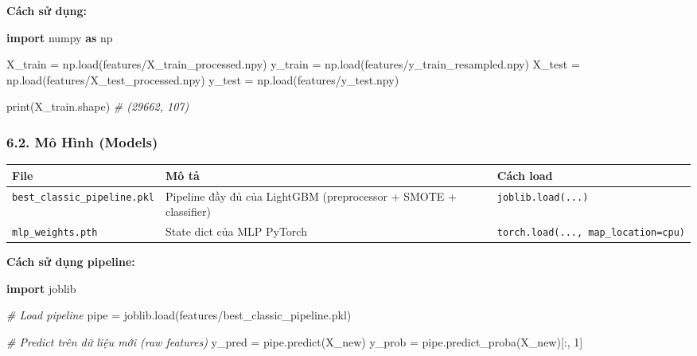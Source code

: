\documentclass[
]{article}
\newenvironment{Shaded}{}{}
\newcommand{\BuiltInTok}[1]{\textcolor[rgb]{0.00,0.50,0.00}{#1}}
\newcommand{\CommentTok}[1]{\textcolor[rgb]{0.38,0.63,0.69}{\textit{#1}}}
\newcommand{\DecValTok}[1]{\textcolor[rgb]{0.25,0.63,0.44}{#1}}
\newcommand{\ImportTok}[1]{\textcolor[rgb]{0.00,0.50,0.00}{\textbf{#1}}}
\newcommand{\NormalTok}[1]{#1}
\newcommand{\OperatorTok}[1]{\textcolor[rgb]{0.40,0.40,0.40}{#1}}
\newcommand{\StringTok}[1]{\textcolor[rgb]{0.25,0.44,0.63}{#1}}
\newcounter{none} %
\begin{document}
\textbf{Cách sử dụng:}

\begin{Shaded}
\begin{Highlighting}[]
\ImportTok{import}\NormalTok{ numpy }\ImportTok{as}\NormalTok{ np}

\NormalTok{X\_train }\OperatorTok{=}\NormalTok{ np.load(}\StringTok{\textquotesingle{}features/X\_train\_processed.npy\textquotesingle{}}\NormalTok{)}
\NormalTok{y\_train }\OperatorTok{=}\NormalTok{ np.load(}\StringTok{\textquotesingle{}features/y\_train\_resampled.npy\textquotesingle{}}\NormalTok{)}
\NormalTok{X\_test }\OperatorTok{=}\NormalTok{ np.load(}\StringTok{\textquotesingle{}features/X\_test\_processed.npy\textquotesingle{}}\NormalTok{)}
\NormalTok{y\_test }\OperatorTok{=}\NormalTok{ np.load(}\StringTok{\textquotesingle{}features/y\_test.npy\textquotesingle{}}\NormalTok{)}

\BuiltInTok{print}\NormalTok{(X\_train.shape)  }\CommentTok{\# (29662, 107)}
\end{Highlighting}
\end{Shaded}

\subsubsection{6.2. Mô Hình (Models)}\label{62-muxf4-huxecnh-models}

{\def\LTcaptype{none} %
\begin{longtable}[]{@{}lll@{}}
\toprule\noalign{}
File & Mô tả & Cách load \\
\midrule\noalign{}
\endhead
\bottomrule\noalign{}
\endlastfoot
\texttt{best\_classic\_pipeline.pkl} & Pipeline đầy đủ của LightGBM
(preprocessor + SMOTE + classifier) & \texttt{joblib.load(...)} \\
\texttt{mlp\_weights.pth} & State dict của MLP PyTorch &
\texttt{torch.load(...,\ map\_location=\textquotesingle{}cpu\textquotesingle{})} \\
\end{longtable}
}

\textbf{Cách sử dụng pipeline:}

\begin{Shaded}
\begin{Highlighting}[]
\ImportTok{import}\NormalTok{ joblib}

\CommentTok{\# Load pipeline}
\NormalTok{pipe }\OperatorTok{=}\NormalTok{ joblib.load(}\StringTok{\textquotesingle{}features/best\_classic\_pipeline.pkl\textquotesingle{}}\NormalTok{)}

\CommentTok{\# Predict trên dữ liệu mới (raw features)}
\NormalTok{y\_pred }\OperatorTok{=}\NormalTok{ pipe.predict(X\_new)}
\NormalTok{y\_prob }\OperatorTok{=}\NormalTok{ pipe.predict\_proba(X\_new)[:, }\DecValTok{1}\NormalTok{]}
\end{Highlighting}
\end{Shaded}
\end{document}
